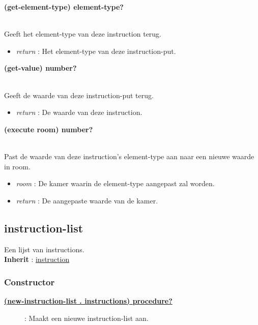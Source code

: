 \documentclass{article}
\newcommand{\ar}{\ding{213} }
\newcommand{\code}[1]{\textcolor{code}{#1}}
\newcommand{\lb}[1][]{\code{(#1}}
\newcommand{\rb}{\code{)}}
\newcommand{\racket}[1]{
	{\color{blue}\textbf{#1}}
}
\begin{document}
\begin{framed}
	\hypertarget{instruction-put:get-element-type}{\racket{\lb[get-element-type]\rb \ar \code{element-type?}}}
	\\Geeft het element-type van deze instruction terug.
	\begin{itemize}
		\item \emph{return} : Het element-type van deze instruction-put.
	\end{itemize}
\end{framed}

\begin{framed}
	\hypertarget{instruction-put:get-value}{\racket{\lb[get-value]\rb \ar \code{number?}}}
	\\Geeft de waarde van deze instruction-put terug.
	\begin{itemize}
		\item \emph{return} : De waarde van deze instruction.
	\end{itemize}
\end{framed}

\begin{framed}
	\hypertarget{instruction-put:execute}{\racket{\lb[execute] room\rb \ar \code{number?}}}
	\\Past de waarde van deze instruction's element-type aan naar een nieuwe waarde in room.
	\begin{itemize}
		\item \emph{room} : De kamer waarin de element-type aangepast zal worden.
		\item \emph{return} : De aangepaste waarde van de kamer.
	\end{itemize}
\end{framed}

\newpage
\hypertarget{instruction-list}{\subsection{instruction-list}}
Een lijst van instructions.
\\\textbf{Inherit} : \hyperlink{instruction}{instruction}

\subsubsection{Constructor}
\begin{description}
	\item[\hyperlink{instruction-list:new-instruction-list}{\racket{\lb[new-instruction-list] . instructions\rb \ar \code{procedure?}}}] : Maakt een nieuwe instruction-list aan.
\end{description}
\end{document}
